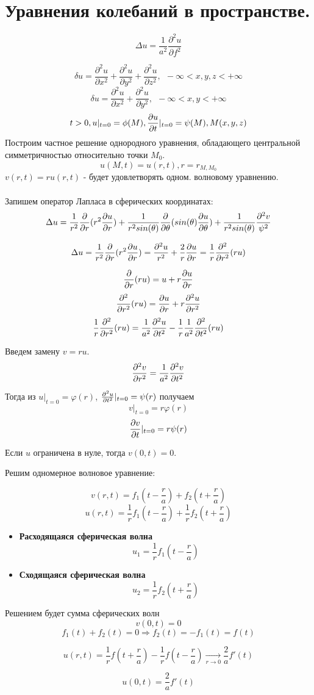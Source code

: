 \documentclass[../main.tex]{subfiles}
\begin{document}
\section{Уравнения колебаний в пространстве.}
$$\Delta u = \frac{1}{a^2}\frac{\partial^2u}{\partial f^2}$$

$$\delta u =\frac{\partial^2u}{\partial x^2} + \frac{\partial^2u}{\partial y^2} + \frac{\partial^2u}{\partial z^2},\ \ -\infty < x,y,z < +\infty$$
$$\delta u =\frac{\partial^2u}{\partial x^2} + \frac{\partial^2u}{\partial y^2},\ \ -\infty < x,y < +\infty$$
$$t>0, u|_{t=0}=\phi(M), \frac{\partial u}{\partial t}|_{t=0}=\psi(M), M(x,y,z)$$
Построим частное решение однородного уравнения, обладающего центральной симметричностью относительно точки $M_0$.
$$u(M,t)=u(r,t), r = r_{M,M_0}$$
$v(r,t)=ru(r,t)$ - будет удовлетворять одном. волновому уравнению.
\\ \\
Запишем оператор Лапласа в сферических координатах:
$$\Delta u = \frac{1}{r^2}\frac{\partial }{\partial r}(r^2\frac{\partial u}{\partial r})+\frac{1}{r^2sin(\theta)}\frac{\partial }{\partial \theta}(sin(\theta)\frac{\partial u}{\partial \theta})+\frac{1}{r^2sin(\theta)}\frac{\partial^2v}{\psi^2}$$

$$\Delta u = \frac{1}{r^2}\frac{\partial }{\partial r}(r^2\frac{\partial u}{\partial r})=\frac{\partial^2u}{r^2}+\frac{2}{r}\frac{\partial u}{\partial r}=\frac{1}{r}\frac{\partial^2}{\partial r^2}(ru)$$

$$\frac{\partial }{\partial r}(ru)=u+r\frac{\partial u}{\partial r}$$
$$\frac{\partial ^2}{\partial r^2}(ru)=\frac{\partial u}{\partial r}+r\frac{\partial ^2u}{\partial r^2}$$
$$\frac{1}{r}\frac{\partial ^2}{\partial r^2}(ru)=\frac{1}{a^2}\frac{\partial ^2u}{\partial t^2}-\frac{1}{r}\frac{1}{a^2}\frac{\partial ^2}{\partial t^2}(ru)$$

Введем замену $v = r u $.
$$\frac{\partial^2 v}{\partial r^2} = \frac{1}{a^2} \frac{\partial^2 v}{\partial t^2} $$

Тогда из $u |_{t=0} = \varphi(r)$, $\frac{\partial^2 u}{\partial t^2} |_{t=0} = \psi(r)$ получаем
$$v |_{t=0} = r \varphi(r)$$
$$\frac{\partial v}{\partial t}|_{t=0} = r \psi(r)$$

Если $u$ ограничена в нуле, тогда $v(0, t)=0$.

Решим одномерное волновое уравнение:

$$v(r, t) = f_1\left(t - \frac{r}{a}\right) + f_2\left(t+ \frac{r}{a}\right)$$
$$u(r, t) = \frac{1}{r} f_1 \left(t - \frac{r}{a}\right) + \frac{1}{r} f_2 \left(t+\frac{r}{a}\right)$$
\begin{itemize}
    \item \textbf{Расходящаяся сферическая волна}
    $$u_1 = \frac{1}{r} f_1\left(t - \frac{r}{a}\right)$$
    \item \textbf{Сходящаяся сферическая волна}
    $$u_2 = \frac{1}{r} f_2\left(t+\frac{r}{a}\right)$$
\end{itemize}
Решением будет сумма сферических волн
$$v(0, t) =0$$
$$f_1(t) + f_2(t) = 0 \Rightarrow f_2(t) = -f_1(t) = f(t)$$

$$u(r, t) = \frac{1}{r}f\left(t+\frac{r}{a}\right) - \frac{1}{r} f\left(t-\frac{r}{a}\right)  \xrightarrow[r \to 0]{} \frac{2}{a} f'(t)$$

$$\boxed{u(0, t) = \frac{2}{a} f'(t)} \label{eq:2.9.1}$$
\end{document}
